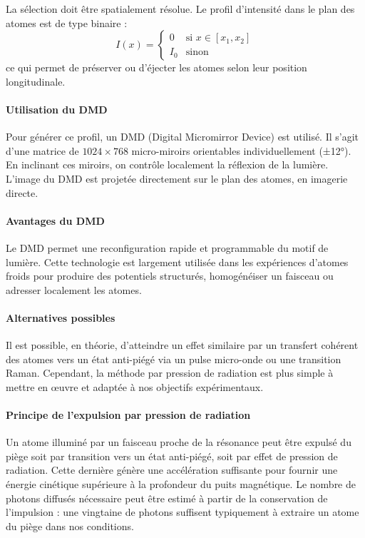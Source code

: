 La sélection doit être spatialement résolue. Le profil d’intensité dans le plan des atomes est de type binaire :
\[
I(x) = 
\begin{cases}
0 & \text{si } x \in [x_1, x_2] \\
I_0 & \text{sinon}
\end{cases}
\]
ce qui permet de préserver ou d’éjecter les atomes selon leur position longitudinale.

\paragraph{Utilisation du DMD}

Pour générer ce profil, un DMD (Digital Micromirror Device) est utilisé. Il s’agit d’une matrice de \(1024 \times 768\) micro-miroirs orientables individuellement (±12°). En inclinant ces miroirs, on contrôle localement la réflexion de la lumière. L’image du DMD est projetée directement sur le plan des atomes, en imagerie directe.

\paragraph{Avantages du DMD}

Le DMD permet une reconfiguration rapide et programmable du motif de lumière. Cette technologie est largement utilisée dans les expériences d’atomes froids pour produire des potentiels structurés, homogénéiser un faisceau ou adresser localement les atomes.

\paragraph{Alternatives possibles}

Il est possible, en théorie, d’atteindre un effet similaire par un transfert cohérent des atomes vers un état anti-piégé via un pulse micro-onde ou une transition Raman. Cependant, la méthode par pression de radiation est plus simple à mettre en œuvre et adaptée à nos objectifs expérimentaux.

\paragraph{Principe de l’expulsion par pression de radiation}

Un atome illuminé par un faisceau proche de la résonance peut être expulsé du piège soit par transition vers un état anti-piégé, soit par effet de pression de radiation. Cette dernière génère une accélération suffisante pour fournir une énergie cinétique supérieure à la profondeur du puits magnétique. Le nombre de photons diffusés nécessaire peut être estimé à partir de la conservation de l’impulsion : une vingtaine de photons suffisent typiquement à extraire un atome du piège dans nos conditions.


